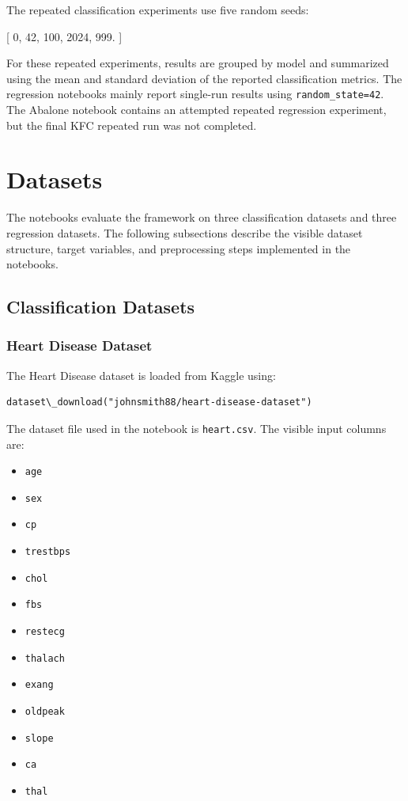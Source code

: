 The repeated classification experiments use five random seeds:

[
    {0, 42, 100, 2024, 999}.
]

For these repeated experiments, results are grouped by model and summarized using the mean and standard deviation of the reported classification metrics. The regression notebooks mainly report single-run results using \texttt{random\_state=42}. The Abalone notebook contains an attempted repeated regression experiment, but the final KFC repeated run was not completed.

\section{Datasets}
\label{sec:datasets}

The notebooks evaluate the framework on three classification datasets and three regression datasets. The following subsections describe the visible dataset structure, target variables, and preprocessing steps implemented in the notebooks.

\subsection{Classification Datasets}

\subsubsection{Heart Disease Dataset}

The Heart Disease dataset is loaded from Kaggle using:

\begin{verbatim}
dataset\_download("johnsmith88/heart-disease-dataset")
\end{verbatim}

The dataset file used in the notebook is \texttt{heart.csv}. The visible input columns are:

\begin{itemize}
    \item \texttt{age}
    \item \texttt{sex}
    \item \texttt{cp}
    \item \texttt{trestbps}
    \item \texttt{chol}
    \item \texttt{fbs}
    \item \texttt{restecg}
    \item \texttt{thalach}
    \item \texttt{exang}
    \item \texttt{oldpeak}
    \item \texttt{slope}
    \item \texttt{ca}
    \item \texttt{thal}
\end{itemize}

